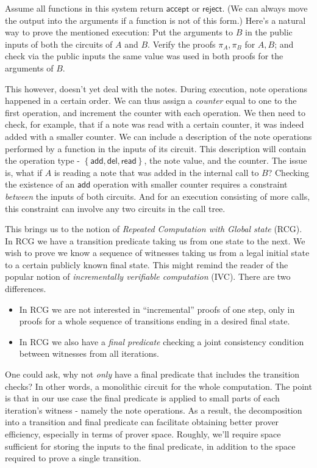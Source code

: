 \documentclass[11pt]{article} %
\newcommand{\rej}{\ensuremath{\mathsf{reject}}\xspace}
\newcommand{\acc}{\ensuremath{\mathsf{accept}}\xspace}
\newcommand{\prf}{\ensuremath{\mathsf{\pi}}\xspace}
\newcommand{\set}[1]{\ensuremath{\left\{#1\right\}}\xspace}
\newcommand{\add}{\ensuremath{\mathsf{add}}\xspace}
\newcommand{\del}{\ensuremath{\mathsf{del}}\xspace}
\renewcommand{\read}{\ensuremath{\mathsf{read}}\xspace}
\begin{document}
Assume all functions in this system return \acc or \rej. (We can always move the output into the arguments if a function is not of this form.)
Here's a natural way to prove the mentioned execution: Put the arguments to $B$ in the public inputs of both the circuits of $A$ and $B$.
Verify the proofs $\prf_A,\prf_B$ for $A,B$; and check via the public inputs the same value was used in both proofs for the arguments of $B$.

This however, doesn't yet deal with the notes. During execution, note operations happened in a certain order.
We can thus assign a \emph{counter} equal to one to the first operation, and increment the counter with each operation.
We then need to check, for example, that if a note was read with a certain counter, it was indeed added
with a smaller counter.
We can include a description of the note operations performed by a function in the inputs of its circuit. This description will contain the operation type - \set{\add,\del,\read}, the note value, and the counter.
The issue is, what if $A$ is reading a note that was added in the internal call to $B$?
Checking the existence of an $\add$ operation with smaller counter requires a constraint \emph{between} the inputs of both circuits. And for an execution consisting of more calls, this constraint can involve any two circuits in the call tree. 

This brings us to the notion of \emph{Repeated Computation with Global state} (RCG). In RCG we have a transition predicate taking us from one state to the next. We wish to prove we know a sequence of witnesses taking us from a legal initial state to a certain publicly known final state. This might remind the reader of the popular notion of \emph{incrementally verifiable computation} (IVC). There are two differences.

\begin{itemize}
 \item 
In RCG we are not interested in ``incremental'' proofs of one step, only in proofs for a whole
sequence of transitions ending in a desired final state.

\item In RCG we also have a \emph{final predicate} checking a joint consistency condition between witnesses from all iterations.

\end{itemize}
 One could ask, why not \emph{only} have a final predicate that includes the transition checks? In other words, a monolithic circuit for the whole computation.
The point is that in our use case the final predicate is applied to small parts of each iteration's witness - namely the note operations. As a result, the decomposition into a transition and final predicate can facilitate obtaining better prover efficiency, especially in terms of prover space.
Roughly, we'll require space sufficient for storing the inputs to the final predicate, in addition to the space required to prove a single transition.
\end{document}
